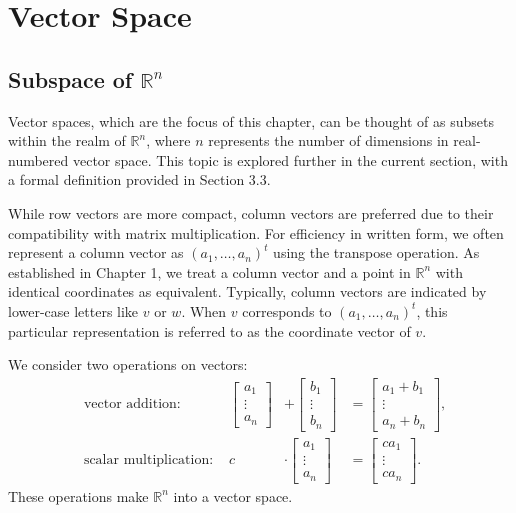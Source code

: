 \documentclass[
]{book}
\theoremstyle{definition}
\theoremstyle{definition}
\theoremstyle{definition}
\theoremstyle{definition}
\theoremstyle{remark}
\begin{document}
\hypertarget{vector-space}{%
\chapter{Vector Space}\label{vector-space}}

\hypertarget{subspace-of-mathbbrn}{%
\section{\texorpdfstring{Subspace of \(\mathbb{R}^n\)}{Subspace of \textbackslash mathbb\{R\}\^{}n}}\label{subspace-of-mathbbrn}}

Vector spaces, which are the focus of this chapter, can be thought of as subsets within the realm of \(\mathbb{R}^n\), where \(n\) represents the number of dimensions in real-numbered vector space. This topic is explored further in the current section, with a formal definition provided in Section 3.3.

While row vectors are more compact, column vectors are preferred due to their compatibility with matrix multiplication. For efficiency in written form, we often represent a column vector as \((a_1, \ldots, a_n)^t\) using the transpose operation. As established in Chapter 1, we treat a column vector and a point in \(\mathbb{R}^n\) with identical coordinates as equivalent. Typically, column vectors are indicated by lower-case letters like \(v\) or \(w\). When \(v\) corresponds to \((a_1, \ldots, a_n)^t\), this particular representation is referred to as the coordinate vector of \(v\).

We consider two operations on vectors:
\begin{align*}
& \text{vector addition: } & \begin{bmatrix} a_1 \\ \vdots \\ a_n \end{bmatrix} &+ \begin{bmatrix} b_1 \\ \vdots \\ b_n \end{bmatrix} &= \begin{bmatrix} a_1 + b_1 \\ \vdots \\ a_n + b_n \end{bmatrix}, \\
& \text{scalar multiplication: } & c &\cdot \begin{bmatrix} a_1 \\ \vdots \\ a_n \end{bmatrix} &= \begin{bmatrix} ca_1 \\ \vdots \\ ca_n \end{bmatrix}.
\end{align*}
These operations make \(\mathbb{R}^n\) into a vector space.
\end{document}
